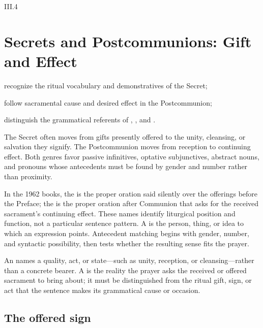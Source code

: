 \begin{courseunit}{III.4}
\chapter{Secrets and Postcommunions: Gift and Effect}

\begin{learningobjectives}
  \item recognize the ritual vocabulary and demonstratives of the Secret;
  \item follow sacramental cause and desired effect in the Postcommunion;
  \item distinguish the grammatical referents of , , and .
\end{learningobjectives}

The Secret often moves from gifts presently offered to the unity, cleansing,
or salvation they signify. The Postcommunion moves from reception to continuing
effect. Both genres favor passive infinitives, optative subjunctives, abstract
nouns, and pronouns whose antecedents must be found by gender and number rather
than proximity.

In the 1962 books, the  is the proper oration said silently over
the offerings before the Preface; the  is the proper
oration after Communion that asks for the received sacrament's continuing
effect. These names identify liturgical position and function, not a particular
sentence pattern. A  is the person, thing, or idea to which an
expression points. Antecedent matching begins with gender, number, and
syntactic possibility, then tests whether the resulting sense fits the prayer.

An  names a quality, act, or state---such as unity,
reception, or cleansing---rather than a concrete bearer. A  is the reality the prayer asks the received or offered sacrament to
bring about; it must be distinguished from the ritual gift, sign, or act that
the sentence makes its grammatical cause or occasion.

\section{The offered sign}

\begin{quote}


\end{quote}
\end{courseunit}
